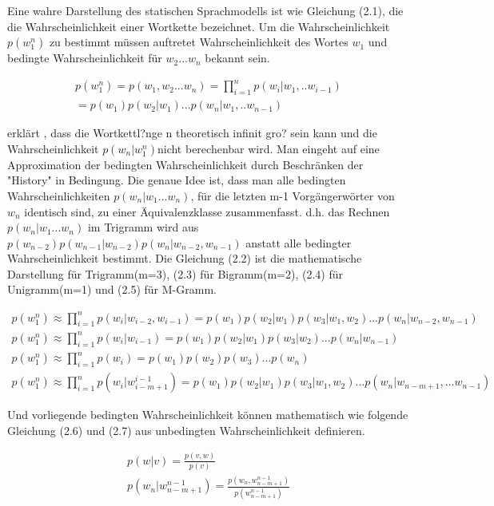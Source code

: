 Eine wahre Darstellung des statischen Sprachmodells ist wie Gleichung (2.1), die die Wahrscheinlichkeit einer Wortkette bezeichnet. Um die Wahrscheinlichkeit $p(w_{1}^n)$ zu bestimmt m\"ussen auftretet Wahrscheinlichkeit des Wortes $w_{1}$ und bedingte Wahrscheinlichkeit f\"ur $w_{2}...w_{n}$ bekannt sein.

\begin{multline}
p(w_{1}^n) = p(w_{1},w_{2}...w_{n}) = \prod_{i=1}^n p(w_{i}|w_{1},..w_{i-1}) \\
= p(w_{1})p(w_{2}|w_{1})...p(w_{n}|w_{1},..w_{n-1})
\end{multline}

\cite{book_speech} erkl\"art , dass die Wortkettl?nge n theoretisch infinit gro? sein kann und die Wahrscheinlichkeit $p(w_{n}|w_{1}^n)$nicht berechenbar wird. Man eingeht auf eine Approximation der bedingten Wahrscheinlichkeit durch Beschr\"anken der "History" in Bedingung. Die genaue Idee ist, dass man alle bedingten Wahrscheinlichkeiten $p(w_{n}|w_{1}...w_{n})$, f\"ur die letzten m-1 Vorg\"angerw\"orter von $w_{n}$ identisch sind, zu einer \"Aquivalenzklasse zusammenfasst. d.h. das Rechnen $p(w_{n}|w_{1}...w_{n})$ im Trigramm wird aus $p(w_{n-2})p(w_{n-1}|w_{n-2})p(w_{n}|w_{n-2},w_{n-1})$ anstatt alle bedingter Wahrscheinlichkeit bestimmt. 
Die Gleichung (2.2) ist die mathematische Darstellung f\"ur Trigramm(m=3), (2.3) f\"ur Bigramm(m=2), (2.4) f\"ur Unigramm(m=1) und (2.5) f\"ur M-Gramm.

\begin{gather}
p(w_{1}^n) \approx \prod_{i=1}^n p(w_{i}|w_{i-2},w_{i-1})=p(w_{1})p(w_{2}|w_{1})p(w_{3}|w_{1},w_{2})...p(w_{n}|w_{n-2},w_{n-1}) \\
p(w_{1}^n) \approx \prod_{i=1}^n p(w_{i}|w_{i-1})=p(w_{1})p(w_{2}|w_{1})p(w_{3}|w_{2})...p(w_{n}|w_{n-1}) \\
p(w_{1}^n) \approx \prod_{i=1}^n p(w_{i})=p(w_{1})p(w_{2})p(w_{3})...p(w_{n})\\
p(w_{1}^n) \approx \prod_{i=1}^n p(w_{i}|w_{i-m+1}^{i-1})=p(w_{1})p(w_{2}|w_{1})p(w_{3}|w_{1},w_{2})...p(w_{n}|w_{n-m+1},...w_{n-1})
\end{gather}

Und vorliegende bedingten Wahrscheinlichkeit k\"onnen mathematisch wie folgende Gleichung (2.6) und (2.7)  aus unbedingten Wahrscheinlichkeit definieren.

\begin{gather}
p(w|v)=\frac{p(v,w)}{p(v)} \\
p(w_{n}|w_{n-m+1}^{n-1})=\frac{p(w_{n},w_{n-m+1}^{n-1} )}{p(w_{n-m+1}^{n-1})} 
\end{gather}

